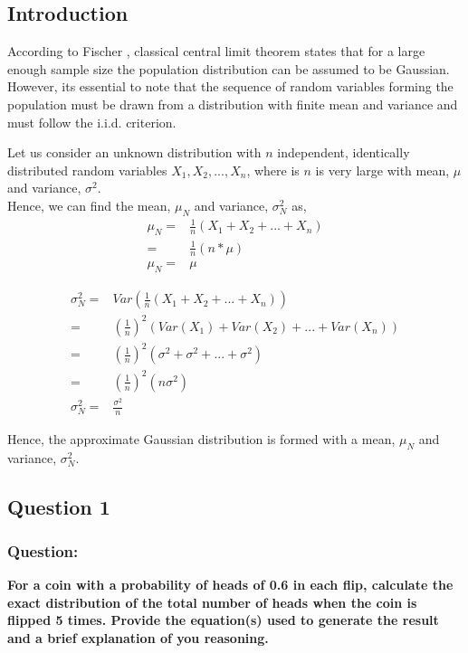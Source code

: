 \documentclass[12pt,twoside,a4paper]{article}
\begin{document}
\subsection{Introduction}
According to Fischer \cite{CLT}, classical central limit theorem states that for a large enough sample size the population distribution can be assumed to be Gaussian. However, its essential to note that the sequence of random variables forming the population must be drawn from a distribution with finite mean and variance and must follow the i.i.d. criterion.

Let us consider an unknown distribution with $n$ independent, identically distributed random variables $X_1, X_2, ..., X_n$, where is $n$ is very large with mean, $\mu$ and variance, $\sigma^2$. \\

Hence, we can find the mean, $\mu_N$ and variance, $\sigma^2_N$ as,
\begin{align}
\mu_N =& \frac{1}{n}(X_1+X_2+...+X_n) \\
      =& \frac{1}{n}(n*\mu) \\
\mu_N =& \mu
\end{align}

\begin{align}
\sigma^2_N =& Var\left( \frac{1}{n}(X_1+X_2+...+X_n) \right ) \\
           =& \left( \frac{1}{n} \right )^2 \left(Var(X_1)+Var(X_2)+...+Var(X_n) \right ) \\
           =& \left( \frac{1}{n} \right )^2 \left(\sigma^2+\sigma^2+...+\sigma^2 \right ) \\
           =& \left( \frac{1}{n} \right )^2(n\sigma^2) \\
\sigma^2_N =& \frac{\sigma^2}{n}
\end{align}

Hence, the approximate Gaussian distribution is formed with a mean, $\mu_N$ and variance, $\sigma^2_N$.
\subsection{Question 1}

\subsubsection*{Question:}
\textbf{For a coin with a probability of heads of 0.6 in each flip, calculate the exact distribution of the total number of heads when the coin is flipped 5 times. Provide the equation(s) used to generate the result and a brief explanation of you reasoning.}
\end{document}
